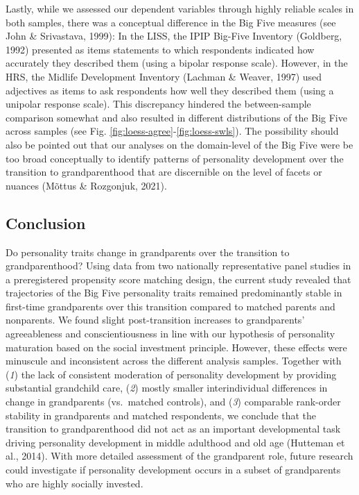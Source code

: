 \documentclass[
  english,
  man, noextraspace]{apa7}
\begin{document}
Lastly, while we assessed our dependent variables through highly reliable scales in both samples, there was a conceptual difference in the Big Five measures (see John \& Srivastava, 1999): In the LISS, the IPIP Big-Five Inventory (Goldberg, 1992) presented as items statements to which respondents indicated how accurately they described them (using a bipolar response scale). However, in the HRS, the Midlife Development Inventory (Lachman \& Weaver, 1997) used adjectives as items to ask respondents how well they described them (using a unipolar response scale). This discrepancy hindered the between-sample comparison somewhat and also resulted in different distributions of the Big Five across samples (see Fig. \ref{fig:loess-agree}-\ref{fig:loess-swls}). The possibility should also be pointed out that our analyses on the domain-level of the Big Five were be too broad conceptually to identify patterns of personality development over the transition to grandparenthood that are discernible on the level of facets or nuances (Mõttus \& Rozgonjuk, 2021).

\hypertarget{conclusion}{%
\subsection{Conclusion}\label{conclusion}}

Do personality traits change in grandparents over the transition to grandparenthood? Using data from two nationally representative panel studies in a preregistered propensity score matching design, the current study revealed that trajectories of the Big Five personality traits remained predominantly stable in first-time grandparents over this transition compared to matched parents and nonparents. We found slight post-transition increases to grandparents' agreeableness and conscientiousness in line with our hypothesis of personality maturation based on the social investment principle. However, these effects were minuscule and inconsistent across the different analysis samples. Together with (\emph{1}) the lack of consistent moderation of personality development by providing substantial grandchild care, (\emph{2}) mostly smaller interindividual differences in change in grandparents (vs.~matched controls), and (\emph{3}) comparable rank-order stability in grandparents and matched respondents, we conclude that the transition to grandparenthood did not act as an important developmental task driving personality development in middle adulthood and old age (Hutteman et al., 2014). With more detailed assessment of the grandparent role, future research could investigate if personality development occurs in a subset of grandparents who are highly socially invested.
\end{document}
